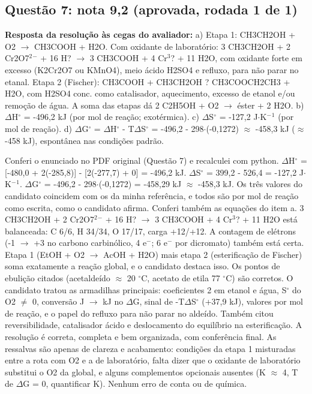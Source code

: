 \documentclass{article}%
\begin{document}
\subsection*{Questão 7: nota 9,2 (aprovada, rodada 1 de 1)}%
\textbf{Resposta da resolução às cegas do avaliador:} a) Etapa 1: CH3CH2OH + O2 $\to$ CH3COOH + H2O. Com oxidante de laboratório: 3 CH3CH2OH + 2 Cr2O7$^2$$^{-}$ + 16 H? $\to$ 3 CH3COOH + 4 Cr$^3$? + 11 H2O, com oxidante forte em excesso (K2Cr2O7 ou KMnO4), meio ácido H2SO4 e refluxo, para não parar no etanal. Etapa 2 (Fischer): CH3COOH + CH3CH2OH ? CH3COOCH2CH3 + H2O, com H2SO4 conc. como catalisador, aquecimento, excesso de etanol e/ou remoção de água. A soma das etapas dá 2 C2H5OH + O2 $\to$ éster + 2 H2O.\newline%
b) $\Delta$H$^\circ$ = -496,2 kJ (por mol de reação; exotérmica).\newline%
c) $\Delta$S$^\circ$ = -127,2 J$\cdot$K$^{-}$$^{1}$ (por mol de reação).\newline%
d) $\Delta$G$^\circ$ = $\Delta$H$^\circ$ - T$\Delta$S$^\circ$ = -496,2 - 298$\cdot$(-0,1272) $\approx$ -458,3 kJ ($\approx$ -458 kJ), espontânea nas condições padrão.\par %
Conferi o enunciado no PDF original (Questão 7) e recalculei com python. $\Delta$H$^\circ$ = {[}-480,0 + 2(-285,8){]} - {[}2(-277,7) + 0{]} = -496,2 kJ. $\Delta$S$^\circ$ = 399,2 - 526,4 = -127,2 J$\cdot$K$^{-}$$^{1}$. $\Delta$G$^\circ$ = -496,2 - 298$\cdot$(-0,1272) = -458,29 kJ $\approx$ -458,3 kJ. Os três valores do candidato coincidem com os da minha referência, e todos são por mol de reação como escrita, como o candidato afirma. Conferi também as equações do item a. 3 CH3CH2OH + 2 Cr2O7$^2$$^{-}$ + 16 H? $\to$ 3 CH3COOH + 4 Cr$^3$? + 11 H2O está balanceada: C 6/6, H 34/34, O 17/17, carga +12/+12. A contagem de elétrons (-1 $\to$ +3 no carbono carbinólico, 4 e$^{-}$; 6 e$^{-}$ por dicromato) também está certa. Etapa 1 (EtOH + O2 $\to$ AcOH + H2O) mais etapa 2 (esterificação de Fischer) soma exatamente a reação global, e o candidato destaca isso. Os pontos de ebulição citados (acetaldeído $\approx$ 20 $^\circ$C, acetato de etila 77 $^\circ$C) são corretos. O candidato tratou as armadilhas principais: coeficientes 2 em etanol e água, S$^\circ$ do O2 $\neq$ 0, conversão J $\to$ kJ no $\Delta$G, sinal de -T$\Delta$S$^\circ$ (+37,9 kJ), valores por mol de reação, e o papel do refluxo para não parar no aldeído. Também citou reversibilidade, catalisador ácido e deslocamento do equilíbrio na esterificação. A resolução é correta, completa e bem organizada, com conferência final. As ressalvas são apenas de clareza e acabamento: condições da etapa 1 misturadas entre a rota com O2 e a de laboratório, falta dizer que o oxidante de laboratório substitui o O2 da global, e alguns complementos opcionais ausentes (K $\approx$ 4, T de $\Delta$G = 0, quantificar K). Nenhum erro de conta ou de química.%
\end{document}

